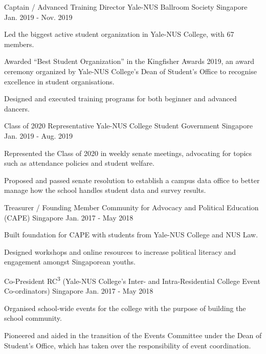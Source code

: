 \begin{cventries}
  \cventry
  {Captain / Advanced Training Director}
  {Yale-NUS Ballroom Society}
  {Singapore}
  {Jan. 2019 - Nov. 2019}
  {
    \begin{cvitems}
    \item {Led the biggest active student organization in Yale-NUS College, with
      67 members.}
    \item {Awarded ``Best Student Organization'' in the Kingfisher Awards 2019,
        an award ceremony organized by Yale-NUS College's Dean of Student's
        Office to recognise excellence in student organisations.}
    \item {Designed and executed training programs for both beginner and
        advanced dancers.}
    \end{cvitems}
  }

  \cventry
  {Class of 2020 Representative}
  {Yale-NUS College Student Government}
  {Singapore}
  {Jan. 2019 - Aug. 2019}
  {
    \begin{cvitems}
    \item {Represented the Class of 2020 in weekly senate meetings, advocating
        for topics such as attendance policies and student welfare.}
    \item {Proposed and passed senate resolution to establish a campus data
        office to better manage how the school handles student data and survey
        results.}
    \end{cvitems}
  }
  
  \cventry
  {Treasurer / Founding Member}
  {Community for Advocacy and Political Education (CAPE)}
  {Singapore}
  {Jan. 2017 - May 2018}
  {
    \begin{cvitems}
    \item {Built foundation for CAPE with students from Yale-NUS
        College and NUS Law.}
    \item {Designed workshops and online resources to increase political
        literacy and engagement amongst Singaporean youths.}
    \end{cvitems}
  }
  
  \cventry
  {Co-President}
  {RC\textsuperscript{3} (Yale-NUS College's Inter- and
    Intra-Residential College Event Co-ordinators)}
  {Singapore}
  {Jan. 2017 - May 2018}
  {
    \begin{cvitems}
    \item {Organised school-wide events for the college with the purpose of
        building the school community.}
    \item {Pioneered and aided in the transition of the Events Committee under
        the Dean of Student's Office, which has taken over the responsibility of
        event coordination.}
    \end{cvitems}
  }


\end{cventries}
